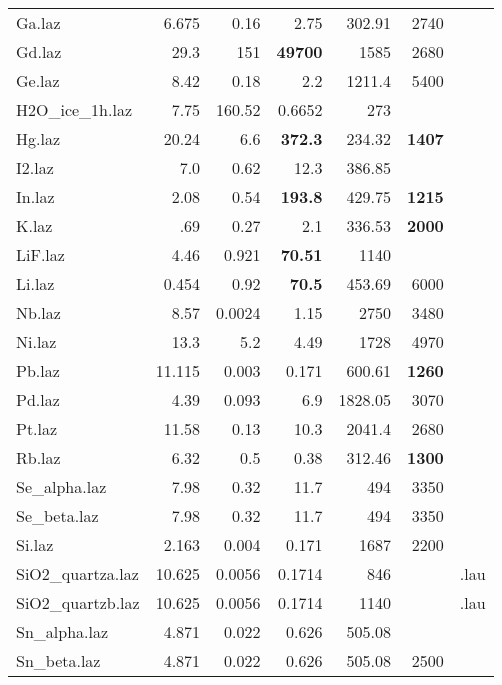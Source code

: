 \begin{table}
\begin{center}
{\begin{small}
\begin{tabular}{|l|rrr|rr|p{}|}
Ga.laz             & 6.675     & 0.16     &2.75      &302.91    &2740&\\
Gd.laz             & 29.3      & 151      &{\bf 49700}     &1585      &2680&\\
Ge.laz             & 8.42      & 0.18     &2.2       &1211.4    &5400  & \\
H2O\_ice\_1h.laz     & 7.75      & 160.52   &0.6652    &273       &     &\\
Hg.laz             & 20.24     & 6.6      &{\bf 372.3}     &234.32    &{\bf 1407}&\\
I2.laz             & 7.0       & 0.62     &12.3      &386.85    &   &\\
In.laz             & 2.08      & 0.54     &{\bf 193.8}     &429.75    &{\bf 1215}&\\
K.laz              & .69       & 0.27     &2.1       &336.53    &{\bf 2000}&\\
LiF.laz            & 4.46      & 0.921    &{\bf 70.51}     &1140      &   &\\
Li.laz             & 0.454     & 0.92     &{\bf 70.5}      &453.69    &6000&\\
Nb.laz             & 8.57      & 0.0024   &1.15      &2750      &3480&\\
Ni.laz             & 13.3      & 5.2      &4.49      &1728      &4970&\\
Pb.laz             & 11.115    & 0.003    &0.171     &600.61    &{\bf 1260}&\\
Pd.laz             & 4.39      & 0.093    &6.9       &1828.05   &3070&\\
Pt.laz             & 11.58     & 0.13     &10.3      &2041.4    &2680&\\
Rb.laz             & 6.32      & 0.5      &0.38      &312.46    &{\bf 1300}  & \\
Se\_alpha.laz       & 7.98      & 0.32     &11.7      &494       &3350&\\
Se\_beta.laz        & 7.98      & 0.32     &11.7      &494       &3350&\\
Si.laz             & 2.163     & 0.004    &0.171     &1687      &2200&\\
SiO2\_quartza.laz   & 10.625    & 0.0056   &0.1714    &846       &      & .lau\\
SiO2\_quartzb.laz   & 10.625    & 0.0056   &0.1714    &1140      &      & .lau\\
Sn\_alpha.laz       & 4.871     & 0.022    &0.626     &505.08    &     &\\
Sn\_beta.laz        & 4.871     & 0.022    &0.626     &505.08    &2500&\\

\end{tabular}
\end{small}}
\end{center}
\end{table}
